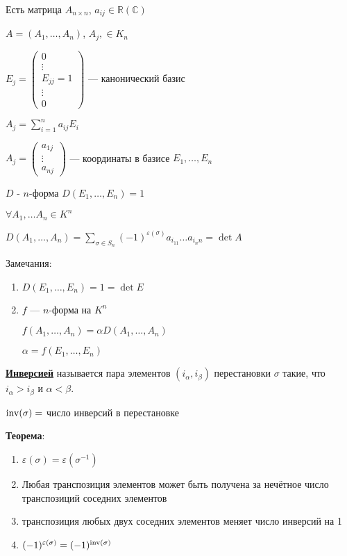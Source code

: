 Есть матрица \(A_{n\times n}\), \(a_{ij} \in \mathbb{R}(\mathbb{C})\)

\(A = (A_1, \ldots, A_n)\), \(A_j, \in K_n\)

\(E_j =
\begin{pmatrix}
    0          \\
    \vdots     \\
    E_{jj} = 1 \\
    \vdots     \\
    0
\end{pmatrix}\) --- канонический базис

\(A_j = \sum\limits_{i = 1}^n a_{ij} E_i\)

\(A_j =
\begin{pmatrix}
    a_{1j} \\
    \vdots \\
    a_{nj}
\end{pmatrix}\) --- координаты в базисе \(E_1, \ldots, E_n\)

\(D\) - \(n\)-форма \(D(E_1,\ldots, E_n) =1 \)

\(\forall A_1,\ldots A_n \in K^n \)

\(D(A_1,\ldots,A_n)  = \sum\limits_{\sigma \in S_n} (-1)^{\varepsilon(\sigma)} a_{i_11}\ldots a_{i_nn} = \det A\)


Замечания:
\begin{enumerate}
    \item \(D(E_1, \ldots, E_n) = 1 = \det E\)
    \item \(f\) --- \(n\)-форма на \(K^n\)

          \(f(A_1, \ldots, A_n) = \alpha D(A_1, \ldots, A_n)\)

          \(\alpha = f(E_1, \ldots, E_n)\)
\end{enumerate}

\uline{\textbf{Инверсией}} называется пара элементов \((i_\alpha,i_\beta) \) перестановки \(\sigma\) такие, что \(i_\alpha> i_\beta\) и \(\alpha<\beta\).

\(\operatorname{inv}(\sigma) = \) число инверсий в перестановке

\textbf{Теорема}:

\begin{enumerate}
    \item \(\varepsilon(\sigma) = \varepsilon(\sigma^{-1})\)
    \item Любая транспозиция элементов может быть получена за нечётное число транспозиций соседних элементов
    \item транспозиция любых двух соседних элементов меняет число инверсий на 1
    \item \((-1)^{\varepsilon(\sigma)}=(-1)^{\operatorname{inv}(\sigma)}\)
\end{enumerate}

